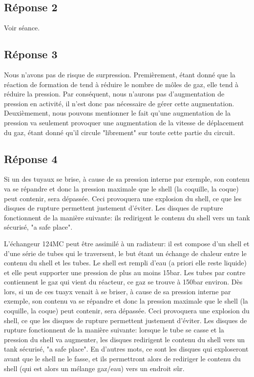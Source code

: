\documentclass[10pt,a4paper]{article}
\begin{document}
\subsection{Réponse 2}

Voir séance.

\subsection{Réponse 3}

Nous n'avons pas de risque de surpression. Premièrement, étant donné que la réaction de formation de  tend à
réduire le nombre de môles de gaz, elle tend à réduire la pression. Par conséquent, nous n'aurons pas d'augmentation de
pression en activité, il n'est donc pas nécessaire de gérer cette augmentation. Deuxièmement, nous pouvons mentionner le
fait qu'une augmentation de la pression va seulement provoquer une augmentation de la vitesse de déplacement du gaz, étant
donné qu'il circule "librement" sur toute cette partie du circuit.

\subsection{Réponse 4}

Si un des tuyaux se brise, à cause de sa pression interne par exemple, son contenu va se répandre et donc la pression
maximale que le shell (la coquille, la coque) peut contenir, sera dépassée. Ceci provoquera une explosion du shell, ce que
les disques de rupture permettent justement d'éviter. Les disques de rupture fonctionnent de la manière suivante: ils
redirigent le contenu du shell vers un tank sécurisé, "a safe place".

L'échangeur 124MC peut être assimilé à un radiateur: il est compose d'un shell et d'une série de tubes qui le
traversent, le but étant un échange de chaleur entre le contenu du shell et les tubes. Le shell est rempli d'eau
(a priori elle reste liquide) et elle peut supporter une pression de plus au moins \unit{15}{bar}. Les tubes par contre
contiennent le gaz qui vient du réacteur, ce gaz se trouve à \unit{150}{bar} environ. Dès lors, si un de ces tuayx venait
à se briser, à cause de sa pression interne par exemple, son contenu va se répandre et donc la pression maximale que le
shell (la coquille, la coque) peut contenir, sera dépassée. Ceci provoquera une explosion du shell, ce que les disques de
rupture permettent justement d'éviter. Les disques de rupture fonctionnent de la manière suivante: lorsque le tube se casse
et la pression du shell va augmenter, les disques redirigent le contenu du shell vers un tank sécurisé, "a safe place". En
d'autres mots, ce sont les disques qui exploseront avant que le shell ne le fasse, et ils permettront alors de rediriger le
contenu du shell (qui est alors un mélange gaz/eau) vers un endroit sûr.
\end{document}
